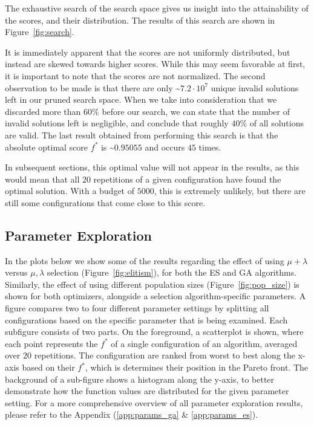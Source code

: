 \documentclass{article}
\begin{document}
The exhaustive search of the search space gives us insight into the attainability of the scores, and their distribution.
The results of this search are shown in Figure~\ref{fig:search}.

It is immediately apparent that the scores are not uniformly distributed, but instead are skewed towards higher scores.
While this may seem favorable at first, it is important to note that the scores are not normalized.
The second observation to be made is that there are only \textasciitilde $7.2 \cdot 10^7$ unique invalid solutions left in our pruned search space.
When we take into consideration that we discarded more than $60\%$ before our search, we can state that the number of invalid solutions left is negligible, and conclude that roughly $40\%$ of all solutions are valid.
The last result obtained from performing this search is that the absolute optimal score $f^*$ is \textasciitilde $0.95055$ and occurs $45$ times.

In subsequent sections, this optimal value will not appear in the results, as this would mean that all $20$ repetitions of a given configuration have found the optimal solution.
With a budget of $5000$, this is extremely unlikely, but there are still some configurations that come close to this score.

\newpage

\subsection*{Parameter Exploration}

In the plots below we show some of the results regarding the effect of using $\mu + \lambda$ versus $\mu, \lambda$ selection (Figure~\ref{fig:elitism}), for both the ES and GA algorithms.
Similarly, the effect of using different population sizes (Figure~\ref{fig:pop_size}) is shown for both optimizers, alongside a selection algorithm-specific parameters.
A figure compares two to four different parameter settings by splitting all configurations based on the specific parameter that is being examined.
Each subfigure consists of two parts.
On the foreground, a scatterplot is shown, where each point represents the $f^*$ of a single configuration of an algorithm, averaged over $20$ repetitions.
The configuration are ranked from worst to best along the x-axis based on their $f^*$, which is determines their position in the Pareto front.
The background of a sub-figure shows a histogram along the y-axis, to better demonstrate how the function values are distributed for the given parameter setting.
For a more comprehensive overview of all parameter exploration results, please refer to the Appendix (\ref{app:params_ga} \& \ref{app:params_es}).
\end{document}

